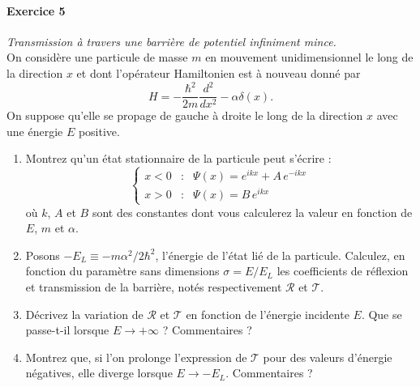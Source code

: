 \paragraph{Exercice 5} \textit{Transmission à travers une barrière de potentiel infiniment mince.} \\
On considère une particule de masse $m$ en mouvement unidimensionnel le long de la direction $x$ et dont l'opérateur Hamiltonien est à nouveau donné par
\begin{equation}
H = -\frac{\hbar^2}{2m} \frac{d^2}{dx^2} - \alpha \delta(x).
\end{equation}
On suppose qu'elle se propage de gauche à droite le long de la direction $x$ avec une énergie $E$ positive. 
\begin{enumerate}
\item Montrez qu'un état stationnaire de la particule peut s'écrire :
\begin{equation}
\left\lbrace
\begin{array}{ccl}
x<0 & : & \Psi(x) = e^{ikx} + A \, e^{-ikx} \\ 
x>0 & : & \Psi(x) = B \, e^{ikx}
\end{array} 
\right.
\end{equation}
où $k$, $A$ et $B$ sont des constantes dont vous calculerez la valeur en fonction de $E$, $m$ et $\alpha$. 
\item Posons $-E_L \equiv -m\alpha^2/2\hbar^2$, l'énergie de l'état lié de la particule. Calculez, en fonction du paramètre sans dimensions $\sigma = E/E_L$ les coefficients de réflexion et transmission de la barrière, notés respectivement $\mathcal{R}$ et $\mathcal{T}$.
\item Décrivez la variation de $\mathcal{R}$ et $\mathcal{T}$ en fonction de l'énergie incidente $E$. Que se passe-t-il lorsque $E\to+\infty$ ? Commentaires ?
\item Montrez que, si l'on prolonge l'expression de $\mathcal{T}$ pour des valeurs d'énergie négatives, elle diverge lorsque $E\to-E_L$. Commentaires ?
\end{enumerate}

